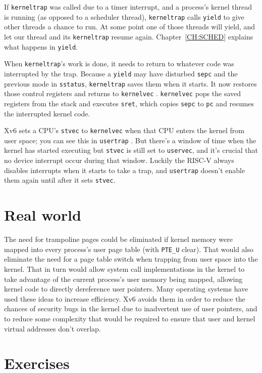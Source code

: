 If {\tt kerneltrap} was called due to a timer interrupt, and a
process's kernel thread is running (as opposed to a scheduler thread),
{\tt kerneltrap} calls {\tt yield} to give other threads a chance to
run. At some point one of those threads will yield, and let our thread
and its {\tt kerneltrap} resume again.
Chapter~\ref{CH:SCHED} explains what happens in {\tt yield}.

When {\tt kerneltrap}'s work is done, it needs to return to whatever
code was interrupted by the trap. Because a {\tt yield} may have
disturbed {\tt sepc} and the previous mode in {\tt sstatus},
{\tt kerneltrap} saves them when it starts. It now restores those
control registers and returns to {\tt kernelvec}
.
{\tt kernelvec} pops the saved registers from the stack and
executes {\tt sret}, which copies {\tt sepc} to {\tt pc}
and resumes the interrupted kernel code.

Xv6 sets a CPU's {\tt stvec} to {\tt kernelvec} when that CPU
enters the kernel from user space; you can see this in {\tt usertrap}
.
But there's a window of time when the kernel has started executing
but {\tt stvec} is still set to {\tt uservec}, and it's crucial that 
no device interrupt occur during that window.
Luckily the RISC-V always disables interrupts when it starts
to take a trap, and {\tt usertrap} doesn't enable them again until
after it sets {\tt stvec}.

\section{Real world}

The need for trampoline pages could be eliminated if kernel
memory were mapped into every process's user page table (with
\lstinline{PTE_U} clear).
That would
also eliminate the need for a page table switch when trapping from
user space into the kernel. That in turn would allow system call
implementations in the kernel to take advantage of the current
process's user memory being mapped, allowing kernel code to directly
dereference user pointers. Many operating systems have used these ideas to
increase efficiency. Xv6 avoids them in order to reduce the chances of
security bugs in the kernel due to inadvertent use of user pointers,
and to reduce some complexity that would be required to ensure that
user and kernel virtual addresses don't overlap.

\section{Exercises}

